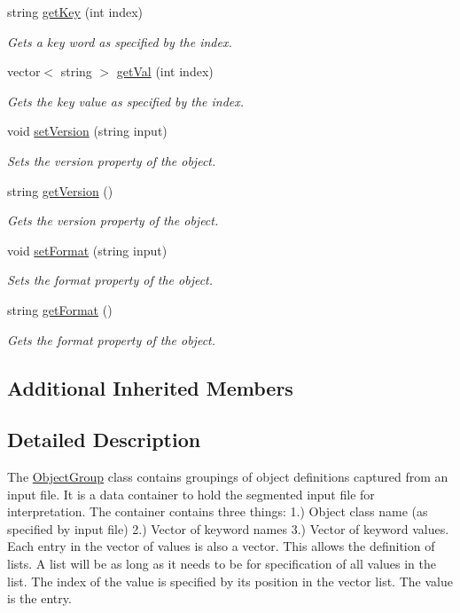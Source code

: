 \begin{DoxyCompactItemize}
string \hyperlink{class_object_group_a818bd77a51e5617fb26481d09eb16714}{get\-Key} (int index)
\begin{DoxyCompactList}\small\item\em Gets a key word as specified by the index. \end{DoxyCompactList}\item 
vector$<$ string $>$ \hyperlink{class_object_group_a35ccc728179fdc3db8712f553746caf9}{get\-Val} (int index)
\begin{DoxyCompactList}\small\item\em Gets the key value as specified by the index. \end{DoxyCompactList}\item 
void \hyperlink{class_object_group_af96a1bfc267ec14cfcac753d85385ce4}{set\-Version} (string input)
\begin{DoxyCompactList}\small\item\em Sets the version property of the object. \end{DoxyCompactList}\item 
string \hyperlink{class_object_group_aa3603cc9c8ae5a0d3e1dc73cc531cb6b}{get\-Version} ()
\begin{DoxyCompactList}\small\item\em Gets the version property of the object. \end{DoxyCompactList}\item 
void \hyperlink{class_object_group_a959373d3c0b97eceb671985b0632dc9c}{set\-Format} (string input)
\begin{DoxyCompactList}\small\item\em Sets the format property of the object. \end{DoxyCompactList}\item 
string \hyperlink{class_object_group_a8e08f57a3e0bcaa7e81ba45173ef6e55}{get\-Format} ()
\begin{DoxyCompactList}\small\item\em Gets the format property of the object. \end{DoxyCompactList}\end{DoxyCompactItemize}
\subsection*{Additional Inherited Members}


\subsection{Detailed Description}
The \hyperlink{class_object_group}{Object\-Group} class contains groupings of object definitions captured from an input file. It is a data container to hold the segmented input file for interpretation. The container contains three things\-: 1.) Object class name (as specified by input file) 2.) Vector of keyword names 3.) Vector of keyword values. Each entry in the vector of values is also a vector. This allows the definition of lists. A list will be as long as it needs to be for specification of all values in the list. The index of the value is specified by its position in the vector list. The value is the entry. 


